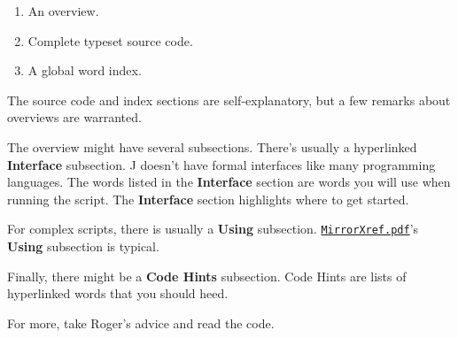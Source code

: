 \begin{enumerate}
\tightlist
\item
  An overview.
\item
  Complete typeset source code.
\item
  A global word index.
\end{enumerate}

The source code and index sections are self-explanatory, but a few
remarks about overviews are warranted.

The overview might have several subsections. There's usually a
hyperlinked \textbf{Interface} subsection. J doesn't have formal
interfaces like many programming languages. The words listed in the
\textbf{Interface} section are words you will use when running the
script. The \textbf{Interface} section highlights where to get started.

For complex scripts, there is usually a \textbf{Using} subsection.
\href{https://github.com/bakerjd99/jacks/blob/master/mirrorxref/MirrorXref.pdf}{\texttt{MirrorXref.pdf}}'s
\textbf{Using} subsection is typical.

Finally, there might be a \textbf{Code Hints} subsection. Code Hints are
lists of hyperlinked words that you should heed.

For more, take Roger's advice and read the code.


%
 

